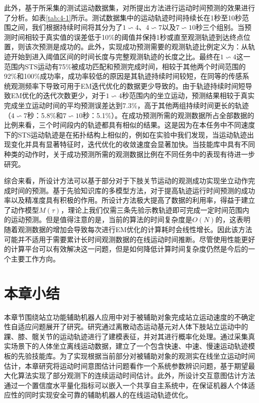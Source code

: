 此外，基于所采集的测试运动数据集，对所提出方法进行运动时间预测的效果进行了分析。如表\ref{tab:4-1}所示。测试数据集中的运动轨迹时间持续长在1秒至10秒范围之间，我们根据持续时间将其分为了$1\backsim 4$、$4\backsim 7$以及$7\backsim 10$秒三个组别。当预测时间相较于真实值的误差低于10\%的阈值并保持1秒或直至观测轨迹到达终点位置，则该次预测是成功的。此外，实现成功预测需要的观测轨迹比例定义为：从轨迹开始到进入阈值区间的时间长度与完整观测轨迹的长度之比。最终在$1\backsim 4$这一范围内STS运动有75\%被成功匹配和预测完成时间，相较于其他两个时间范围的92\%和100\%成功率，成功率较低的原因是其轨迹持续时间较短，在同等的传感系统观测频率下导致可用于EM迭代优化的数据更少导致的。由于轨迹持续时间短导致EM优化的迭代次数更少，对于$1\backsim 4$秒范围内的坐立运动，预测结果相较于真实完成坐立运动时间的平均预测误差达到7.3\%，高于其他两组持续时间更长的轨迹（$4\backsim 7$秒：5.8\%和$7\backsim 10$秒：5.1\%）。在成功预测所需的观测数据所占全部数据的比例来看，三个时间段内的轨迹都具有相似的结果。这是因为在本任务中不同速度下的STS运动轨迹是在拓扑结构上相似的，例如在实验中我们发现，当运动轨迹出现变化并具有显著特征时，迭代优化的收敛速度会显著加快。当技能库中具有不同种类的动作时，关于成功预测所需的观测数据比例在不同任务中的表现有待进一步研究。

综合来看，所设计方法可以基于部分对于下肢关节运动的观测成功实现坐立动作完成时间的预测。基于先验知识库的多模型方法，对于提高轨迹运行时间预测的成功率以及精准度具有积极的作用。所设计方法极大提高了数据的利用率，得益于建立了动作模型$M(\tau)$，理论上我们仅需三条先验示教轨迹即可完成一定时间范围内的运动预测。但是值得注意的是，当前的算法的时间复杂度是$O(N)$的，这表明随着观测数据的增加会导致每次进行EM优化的计算耗时会线性增长。因此该方法可能并不适用于需要累计长时间观测数据的在线运动时间推断。尽管使用性能更好的计算平台可以有效解决这一问题，但是如何降低计算时间复杂度仍然是今后的一个主要工作方向。

\section{本章小结}
本章节围绕站立功能辅助机器人应用中对于被辅助对象完成站立运动速度的不确定性自适应问题展开了研究。研究通过离散动态运动基元对人体下肢站立运动中的踝、膝、髋关节的运动轨迹进行了建模表征，并对其进行概率化处理。通过采集真实场景下的人体坐立离线运动数据，建立了一个包含快速、中速、慢速运动轨迹模板的先验技能库。为了实现根据当前部分对被辅助对象的观测实在线坐立运动时间估计，本章研究将运动时间意图估计问题看作一个系统参数辨识问题，基于期望最大化算法实现了部分观测下的连续运动时间估计。此外，所设计交互意图估计方法通过一个置信度水平量化指标可以嵌入一个共享自主系统中，在保证机器人个体适应性的同时实现安全可靠的辅助机器人的在线运动轨迹优化。
